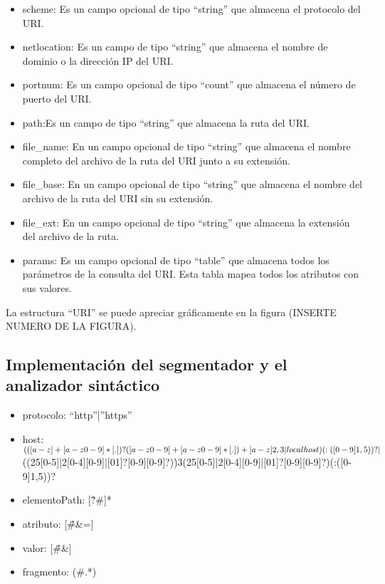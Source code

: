 \begin{itemize}
\item scheme: Es un campo opcional de tipo ``string'' que almacena el protocolo del URI.

\item netlocation: Es un campo de tipo ``string'' que almacena el nombre de dominio o la dirección IP del URI.

\item portnum: Es un campo opcional de tipo ``count''  que almacena el número de puerto del URI.
\item path:Es un campo de tipo ``string'' que almacena la ruta del URI.

\item file\_name: En un campo opcional de tipo ``string'' que almacena el nombre completo  del archivo de la ruta del URI junto a su extensión.

\item file\_base: En un campo opcional de tipo ``string'' que almacena el nombre  del archivo de la ruta del URI sin su extensión.

\item file\_ext: En un campo opcional de tipo ``string'' que almacena la extensión del archivo de la ruta.

\item params: Es un campo opcional de tipo ``table'' que almacena todos los parámetros de la consulta del URI. Esta tabla mapea todos los atributos con sus valores.

\end{itemize}

La estructura ``URI'' se puede apreciar gráficamente en la figura (INSERTE NUMERO DE LA FIGURA).

\subsection{Implementación del segmentador y el analizador sintáctico}\label{subsec:implementacionAutom}

\begin{itemize}
\item protocolo: “http”|”https”
\item host: $(([a-z]+[a-z0-9\-]*[.])?([a-z0-9]+[a-z0-9\-]*[.])+[a-z]{2,3}|localhost)(:([0-9]{1,5}))?|$\\ ((25[0-5]|2[0-4][0-9]|[01]?[0-9][0-9]?)\.){3}(25[0-5]|2[0-4][0-9]|[01]?[0-9][0-9]?)(:([0-9]{1,5}))?
\item elementoPath: [\^?\#]*
\item atributo: [\^\#\&=]
\item valor: [\^\#\&]
\item fragmento: (\#.*)
\end{itemize}

